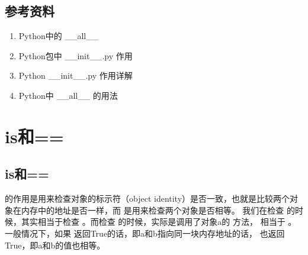 \documentclass[letterpaper,10pt,english]{sphinxmanual}
\begin{document}
\subsection{参考资料}
\label{\detokenize{python/02_all:id1}}\begin{enumerate}
\item {} 
Python中的 \_\_all\_\_

\end{enumerate}
\begin{quote}

\end{quote}
\begin{enumerate}
\setcounter{enumi}{1}
\item {} 
Python包中 \_\_init\_\_.py 作用

\end{enumerate}
\begin{quote}

\end{quote}
\begin{enumerate}
\setcounter{enumi}{2}
\item {} 
Python \_\_init\_\_.py 作用详解

\end{enumerate}
\begin{quote}

\end{quote}
\begin{enumerate}
\setcounter{enumi}{3}
\item {} 
Python中 \_\_all\_\_ 的用法

\end{enumerate}
\begin{quote}

\end{quote}


\section{is和==}
\label{\detokenize{python/03_is:is}}\label{\detokenize{python/03_is::doc}}

\subsection{is和==}
\label{\detokenize{python/03_is:id1}}
 的作用是用来检查对象的标示符（object identity）是否一致，也就是比较两个对象在内存中的地址是否一样，而 \sphinxcode{\sphinxupquote{==}} 是用来检查两个对象是否相等。
我们在检查  的时候，其实相当于检查 。而检查  的时候，实际是调用了对象a的  方法，
相当于 。
一般情况下，如果  返回True的话，即a和b指向同一块内存地址的话， 也返回True，即a和b的值也相等。
\end{document}
